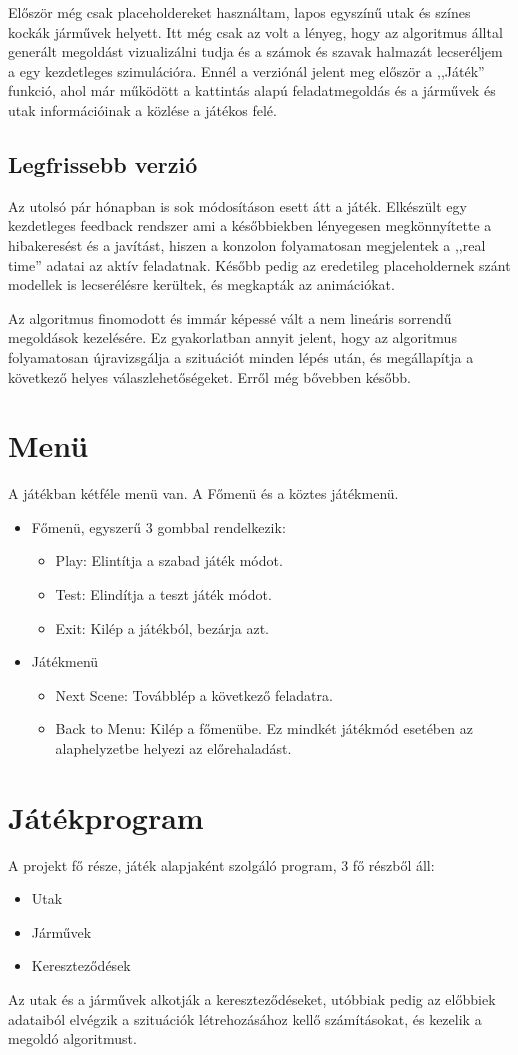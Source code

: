 \documentclass[
]{thesis-ekf}
\theoremstyle{definition}
\theoremstyle{remark}
\begin{document}
Először még csak placeholdereket használtam, lapos egyszínű utak és színes kockák járművek helyett. Itt még csak az volt a lényeg, hogy az algoritmus álltal generált megoldást vizualizálni tudja és a számok és szavak halmazát lecseréljem a egy kezdetleges szimulációra. Ennél a verziónál jelent meg először a ,,Játék'' funkció, ahol már működött a kattintás alapú feladatmegoldás és a járművek és utak információinak a közlése a játékos felé. 
\subsection{Legfrissebb verzió}
Az utolsó pár hónapban is sok módosításon esett átt a játék. Elkészült egy kezdetleges feedback rendszer ami a későbbiekben lényegesen megkönnyítette a hibakeresést és a javítást, hiszen a konzolon folyamatosan megjelentek a ,,real time'' adatai az aktív feladatnak. Később pedig az eredetileg placeholdernek szánt modellek is lecserélésre kerültek, és megkapták az animációkat. \cite{cinemachine} 

Az algoritmus finomodott és immár képessé vált a nem lineáris sorrendű megoldások kezelésére. Ez gyakorlatban annyit jelent, hogy az algoritmus folyamatosan újravizsgálja a szituációt minden lépés után, és megállapítja a következő helyes válaszlehetőségeket. Erről még bővebben később.
\section{Menü}
A játékban kétféle menü van. A Főmenü és a köztes játékmenü.
\begin{itemize}
	\item Főmenü, egyszerű 3 gombbal rendelkezik:
	\begin{itemize}
		\item Play: Elintítja a szabad játék módot.
		\item Test: Elindítja a teszt játék módot.
		\item Exit: Kilép a játékból, bezárja azt.
	\end{itemize}
	\item Játékmenü
	\begin{itemize}
		\item Next Scene: Továbblép a következő feladatra.
		\item Back to Menu: Kilép a főmenübe. Ez mindkét játékmód esetében az alaphelyzetbe helyezi az előrehaladást.
	\end{itemize}
\end{itemize}
\section{Játékprogram}
A projekt fő része, játék alapjaként szolgáló program, 3 fő részből áll:
\begin{itemize}
	\item Utak
	\item Járművek
	\item Kereszteződések
\end{itemize}
Az utak és a járművek alkotják a kereszteződéseket, utóbbiak pedig az előbbiek adataiból elvégzik a szituációk létrehozásához kellő számításokat, és kezelik a megoldó algoritmust.
\end{document}

